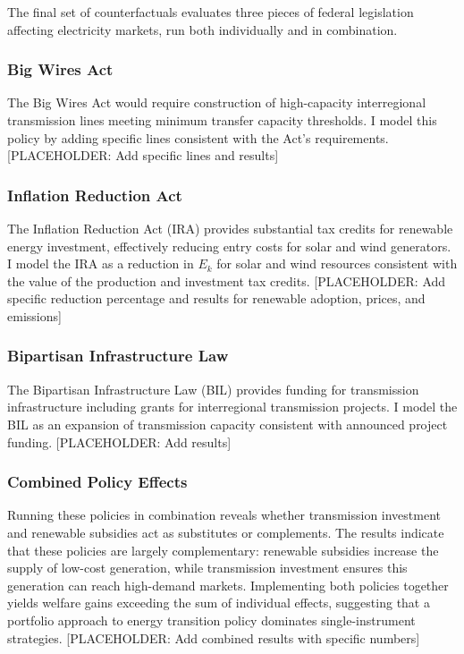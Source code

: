 \documentclass[12pt]{article}
\begin{document}
The final set of counterfactuals evaluates three pieces of federal legislation affecting electricity markets, run both individually and in combination.

\subsubsection{Big Wires Act}

The Big Wires Act would require construction of high-capacity interregional transmission lines meeting minimum transfer capacity thresholds. I model this policy by adding specific lines consistent with the Act's requirements. [PLACEHOLDER: Add specific lines and results]

\subsubsection{Inflation Reduction Act}

The Inflation Reduction Act (IRA) provides substantial tax credits for renewable energy investment, effectively reducing entry costs for solar and wind generators. I model the IRA as a reduction in $E_k$ for solar and wind resources consistent with the value of the production and investment tax credits. [PLACEHOLDER: Add specific reduction percentage and results for renewable adoption, prices, and emissions]

\subsubsection{Bipartisan Infrastructure Law}

The Bipartisan Infrastructure Law (BIL) provides funding for transmission infrastructure including grants for interregional transmission projects. I model the BIL as an expansion of transmission capacity consistent with announced project funding. [PLACEHOLDER: Add results]

\subsubsection{Combined Policy Effects}

Running these policies in combination reveals whether transmission investment and renewable subsidies act as substitutes or complements. The results indicate that these policies are largely complementary: renewable subsidies increase the supply of low-cost generation, while transmission investment ensures this generation can reach high-demand markets. Implementing both policies together yields welfare gains exceeding the sum of individual effects, suggesting that a portfolio approach to energy transition policy dominates single-instrument strategies. [PLACEHOLDER: Add combined results with specific numbers]
\end{document}
